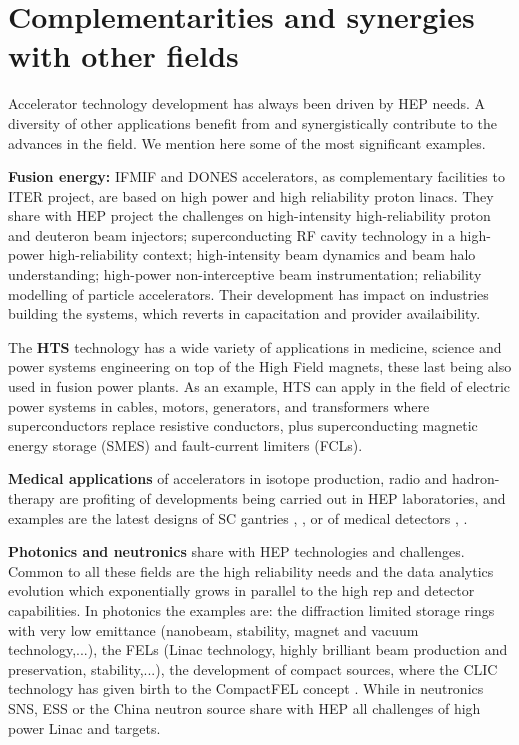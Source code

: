 \section {Complementarities and synergies with other fields}
Accelerator technology development has always been driven by HEP needs. A diversity of other applications benefit from and synergistically contribute to the advances in the field. We mention here some of the most significant examples.

{\bf Fusion energy:} IFMIF and DONES accelerators, as complementary facilities to ITER project, are based on high power and high reliability proton linacs. They share with HEP project the challenges on high-intensity high-reliability proton and deuteron beam injectors; superconducting RF cavity technology in a high-power high-reliability context; high-intensity beam dynamics and beam halo understanding; high-power non-interceptive beam instrumentation; reliability modelling of particle accelerators. Their development has impact on industries building the systems, which reverts in capacitation and provider availaibility.

The {\bf HTS} \cite{HTSapps} technology has a wide variety of applications in medicine, science and power systems engineering on top of the High Field magnets, these last being also used in fusion power plants. As an example, HTS can apply in the field of electric power systems in cables, motors, generators, and transformers where superconductors replace resistive conductors, plus superconducting magnetic energy storage (SMES) and fault-current limiters (FCLs).

{\bf Medical applications} of accelerators in isotope production, radio and hadron-therapy \cite{PTCOG} are profiting of developments being carried out in HEP laboratories, and examples are the latest designs of SC gantries \cite{gatoroid}, \cite{Schippers}, or of medical detectors \cite{GEM}, \cite{DECTRIS}. 

{\bf Photonics and neutronics} share with HEP technologies and challenges. Common to all these fields are the high reliability needs and the data analytics evolution which exponentially grows in parallel to the high rep and detector capabilities. In photonics the examples are: the diffraction limited storage rings with very low emittance (nanobeam, stability, magnet and vacuum technology,...), the FELs (Linac technology, highly brilliant beam production and preservation, stability,...), the development of compact sources, where the CLIC technology has given birth to the  CompactFEL concept \cite{COMPACTLIGHT}. While in neutronics SNS, ESS or the China neutron source share with HEP all challenges of high power Linac and targets. 

